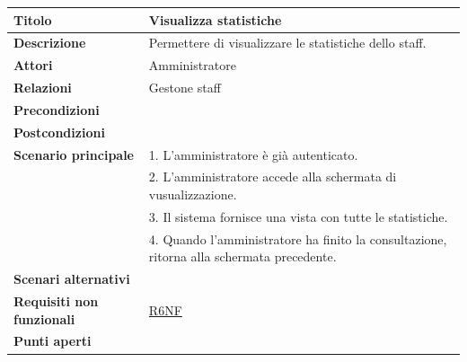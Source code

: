\documentclass[a4paper]{article}
\begin{document}
\begin{center}
\begin{tabularx}{1\textwidth}{|l|X|}
    \hline
	\textbf{Titolo} & Visualizza statistiche \\
	\hline
	\textbf{Descrizione} & Permettere di visualizzare le statistiche dello staff. \\
	\hline
	\textbf{Attori} & Amministratore \\
	\hline
	\textbf{Relazioni} & Gestone staff \\
	\hline
	\textbf{Precondizioni} &  \\
	\hline
	\textbf{Postcondizioni} &  \\
	\hline
	\textbf{Scenario principale} & 1. L'amministratore è già autenticato.\\
	                             & 2. L'amministratore accede alla schermata di vusualizzazione. \\
								 & 3. Il sistema fornisce una vista con tutte le statistiche. \\
								 & 4. Quando l'amministratore ha finito la consultazione, ritorna alla schermata precedente.\\
	\hline
	\textbf{Scenari alternativi} & \\
	\hline
	\textbf{Requisiti non funzionali} & \hyperlink{R6NF}{R6NF} \\
	\hline
	\textbf{Punti aperti} & \\
	\hline
\end{tabularx}
\end{center}

\end{document}
